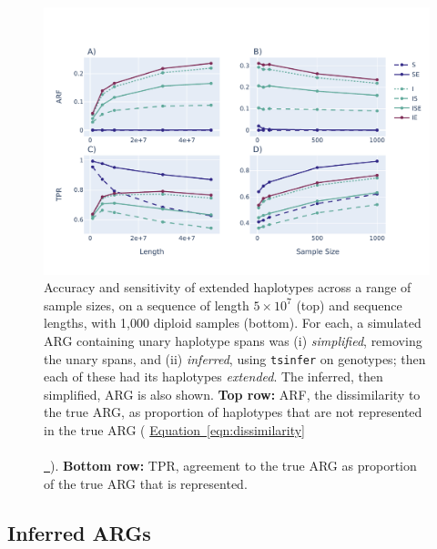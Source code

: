 \documentclass[10pt,twoside,lineno]{gsajnl}
\newcommand{\tsinfer}{\texttt{tsinfer}}
\newcommand*{\eqnref}[2][]{%
	\hyperref[{#2}]{%
		Equation~\ref*{#2}%
		\ifx\\#1\\%
		\else
		\,#1%
		\fi
	}%
}
\begin{document}
\begin{figure}[!hbt]
	\begin{center}
        \includegraphics[width=\textwidth]{figure5.pdf}
	\end{center}
    \caption{
        Accuracy and sensitivity of extended haplotypes
        across a range of sample sizes, on a sequence of length $5\times10^7$ (top)
        and sequence lengths, with 1,000 diploid samples (bottom).
        For each, a simulated ARG containing unary haplotype spans
        was (i) \emph{simplified}, removing the unary spans,
        and (ii) \emph{inferred}, using \tsinfer{} on genotypes;
        then each of these had its haplotypes \emph{extended}.
        The inferred, then simplified, ARG is also shown.
        \textbf{Top row:} ARF, the dissimilarity to the true ARG,
        as proportion of haplotypes that are not represented in the true ARG
        (\eqnref{eqn:dissimilarity}).
        \textbf{Bottom row:} TPR, agreement to the true ARG
        as proportion of the true ARG that is represented.
        }     
    \label{fig:dissimilarity}
\end{figure}


\subsection{Inferred ARGs}
\end{document}
